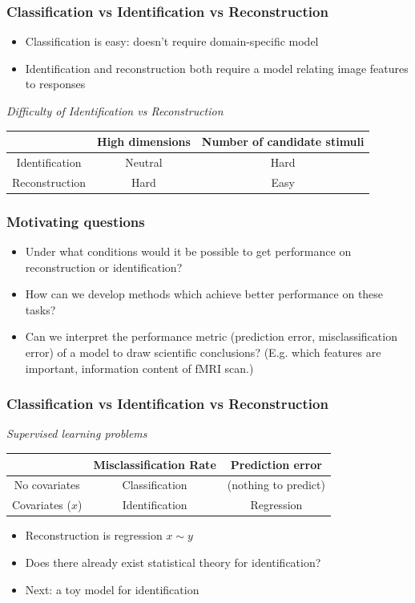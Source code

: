 \documentclass{beamer}
\begin{document}
\begin{frame}
\frametitle{Classification vs Identification vs Reconstruction}
\begin{itemize}
\item Classification is easy: doesn't require domain-specific model
\item Identification and reconstruction both require a model relating image features to responses
\end{itemize}
\begin{center}
\emph{Difficulty of Identification vs Reconstruction}
\begin{tabular}{|c|c|c|}
\hline
&  High dimensions & Number of candidate stimuli \\ \hline
Identification & Neutral & Hard \\ \hline
Reconstruction & Hard & Easy \\ \hline
\end{tabular}
\end{center}
\end{frame}

\begin{frame}
\frametitle{Motivating questions}
\begin{itemize}
\item
Under what conditions would it be possible to get performance on
reconstruction or identification?
\item
How can we develop methods which achieve better performance on these
tasks?
\item
Can we interpret the performance metric (prediction error,
misclassification error) of a model to draw scientific conclusions?
(E.g. which features are important, information content of fMRI scan.)
\end{itemize}
\end{frame}



\begin{frame}
\frametitle{Classification vs Identification vs Reconstruction}
\begin{center}
\emph{Supervised learning problems}
\begin{tabular}{|c|c|c|}
\hline
 & Misclassification Rate & Prediction error \\ \hline
No covariates & Classification & (nothing to predict) \\ \hline
Covariates ($x$) & Identification & Regression \\ \hline
\end{tabular}
\end{center}
\begin{itemize}
\item Reconstruction is regression $ x \sim y$
\item Does there already exist statistical theory for identification?
\item Next: a toy model for identification
\end{itemize}
\end{frame}
\end{document}
